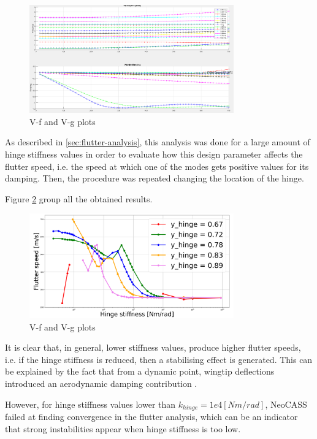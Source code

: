 \documentclass[conference]{IEEEtran}
\newlength\figureheight
\newlength\figurewidth
\begin{document}
\begin{figure}[htp]
  \centering
  \setlength\figureheight{5cm}
  \setlength\figurewidth{6cm}
  \includegraphics[width=250pt]{images/VgVf.png}
  \caption{V-f and V-g plots}
  \label{fig:VgVf}
\end{figure}

As described in \ref{sec:flutter-analysis}, this analysis was done for a large amount of hinge stiffness values in order to evaluate how this design parameter affects the flutter speed, i.e. the speed at which one of the modes gets positive values for its damping. Then, the procedure was repeated changing the location of the hinge.

Figure \ref{fig:flutter_total} group all the obtained results.

\begin{figure}[htp]
  \centering
  \setlength\figureheight{5cm}
  \setlength\figurewidth{6cm}
  \includegraphics[width=250pt]{images/flutter_total.png}
  \caption{V-f and V-g plots}
  \label{fig:flutter_total}
\end{figure}

It is clear that, in general, lower stiffness values, produce higher flutter speeds, i.e. if the hinge stiffness is reduced, then a stabilising effect is generated. This can be explained by the fact that from a dynamic point, wingtip deflections introduced an aerodynamic damping contribution \cite{Castrichini2016}.

However, for hinge stiffness values lower than $k_{hinge} = 1e4 [Nm/rad]$, NeoCASS failed at finding convergence in the flutter analysis, which can be an indicator that strong instabilities appear when hinge stiffness is too low.
\end{document}
